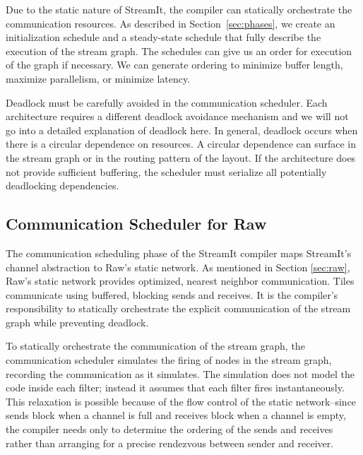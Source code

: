 Due to the static nature of StreamIt, the compiler can statically
orchestrate the communication resources.  As described in
Section~\ref{sec:phases}, we create an initialization schedule and a
steady-state schedule that fully describe the execution of the stream
graph.  The schedules can give us an order for execution of the graph
if necessary.  We can generate ordering to minimize buffer length,
maximize parallelism, or minimize latency.


Deadlock must be carefully avoided in the communication
scheduler. Each architecture requires a different deadlock avoidance
mechanism and we will not go into a detailed explanation of deadlock
here.  In general, deadlock occurs when there is a circular dependence
on resources.  A circular dependence can surface in the stream graph
or in the routing pattern of the layout.  If the architecture does not
provide sufficient buffering, the scheduler must serialize all
potentially deadlocking dependencies.


\subsection{Communication Scheduler for Raw}
\label{sec:rawcommunic}

The communication scheduling phase of the StreamIt compiler maps
StreamIt's channel abstraction to Raw's static network.  As mentioned
in Section \ref{sec:raw}, Raw's static network provides optimized,
nearest neighbor communication.  Tiles communicate using buffered,
blocking sends and receives.  It is the compiler's responsibility to
statically orchestrate the explicit communication of the stream graph
while preventing deadlock.

To statically orchestrate the communication of the stream graph, the
communication scheduler simulates the firing of nodes in the stream
graph, recording the communication as it simulates.  The simulation
does not model the code inside each filter; instead it assumes that
each filter fires instantaneously.  This relaxation is possible
because of the flow control of the static network--since sends block
when a channel is full and receives block when a channel is empty, the
compiler needs only to determine the ordering of the sends and
receives rather than arranging for a precise rendezvous between sender
and receiver.

